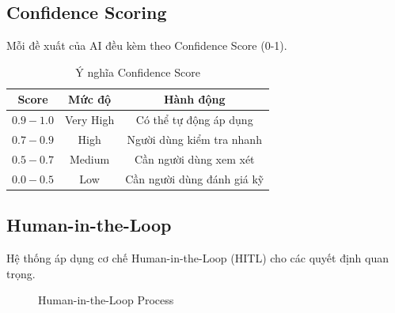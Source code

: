 \documentclass[12pt,a4paper]{report}
\begin{document}
\subsection{Confidence Scoring}

Mỗi đề xuất của AI đều kèm theo Confidence Score (0-1).

\begin{table}[H]
\centering
\caption{Ý nghĩa Confidence Score}
\begin{tabular}{|c|c|c|}
\hline
\textbf{Score} & \textbf{Mức độ} & \textbf{Hành động} \\
\hline
$0.9 - 1.0$ & Very High & Có thể tự động áp dụng \\
\hline
$0.7 - 0.9$ & High & Người dùng kiểm tra nhanh \\
\hline
$0.5 - 0.7$ & Medium & Cần người dùng xem xét \\
\hline
$0.0 - 0.5$ & Low & Cần người dùng đánh giá kỹ \\
\hline
\end{tabular}
\label{tab:confidence_levels}
\end{table}

\subsection{Human-in-the-Loop}

Hệ thống áp dụng cơ chế Human-in-the-Loop (HITL) cho các quyết định quan trọng.

\begin{figure}[H]
\centering
{}
\caption{Human-in-the-Loop Process}
\label{fig:human_in_loop}
\end{figure}
\end{document}
